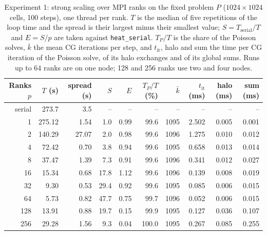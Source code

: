 \begin{table}[htbp]
\centering
\small
\begin{tabular}{rrrrrrrrrr}
\toprule
Ranks $p$ & $T$ (s) & spread (s) & $S$ & $E$ & $T_P/T$ (\%) & $\bar k$ & $t_{\mathrm{it}}$ (ms) & halo (ms) & sum (ms) \\
\midrule
serial & 273.7 & 3.5 & -- & -- & -- & -- & -- & -- & -- \\
\midrule
1 & 275.12 & 1.54 & 1.0 & 0.99 & 99.6 & 1095 & 2.502 & 0.005 & 0.001 \\
2 & 140.29 & 27.07 & 2.0 & 0.98 & 99.6 & 1096 & 1.275 & 0.010 & 0.012 \\
4 & 72.42 & 0.70 & 3.8 & 0.94 & 99.6 & 1095 & 0.658 & 0.013 & 0.014 \\
8 & 37.47 & 1.39 & 7.3 & 0.91 & 99.6 & 1096 & 0.341 & 0.012 & 0.027 \\
16 & 15.34 & 0.68 & 17.8 & 1.12 & 99.6 & 1096 & 0.139 & 0.008 & 0.019 \\
32 & 9.30 & 0.53 & 29.4 & 0.92 & 99.6 & 1095 & 0.085 & 0.006 & 0.015 \\
64 & 5.73 & 0.82 & 47.7 & 0.75 & 99.7 & 1096 & 0.052 & 0.006 & 0.015 \\
128 & 13.91 & 0.88 & 19.7 & 0.15 & 99.9 & 1095 & 0.127 & 0.036 & 0.107 \\
256 & 29.28 & 1.56 & 9.3 & 0.04 & 100.0 & 1095 & 0.267 & 0.085 & 0.255 \\
\bottomrule
\end{tabular}
\caption{Experiment 1: strong scaling over MPI ranks on the fixed problem $P$ ($1024\times1024$ cells, 100 steps), one thread per rank. $T$ is the median of five repetitions of the loop time and the spread is their largest minus their smallest value; $S=T_{\mathrm{serial}}/T$ and $E=S/p$ are taken against \texttt{heat\_serial}. $T_P/T$ is the share of the Poisson solves, $\bar k$ the mean CG iterations per step, and $t_{\mathrm{it}}$, halo and sum the time per CG iteration of the Poisson solve, of its halo exchanges and of its global sums. Runs up to 64 ranks are on one node; 128 and 256 ranks use two and four nodes.}
\label{tab:strong-mpi}
\end{table}
